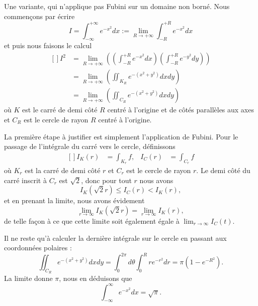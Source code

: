 \begin{example}
    Une variante, qui n'applique pas Fubini sur un domaine non borné. Nous commençons par écrire
\begin{equation}
	I=\int_{-\infty}^{+\infty} e^{-x^2} dx := \lim_{R \to +\infty} \int_{-R}^{+R} e^{-x^2} dx 
\end{equation}
et puis nous faisons le calcul
\begin{equation}		\label{EqCalculInteeemoisxcar}
	\begin{aligned}[]
		I^2 &= \lim_{R \to +\infty} \left( (\int_{-R}^{+R} e^{-x^2} dx)( \int_{-R}^{+R} e^{-y^2} dy) \right) \\
		&= \lim_{R \to +\infty} \left( \iint_{K_R}e^{-(x^2+y^2)} dx dy \right) \\
		&= \lim_{R \to +\infty} \left( \iint_{C_R}e^{-(x^2+y^2)} dx dy \right) 
	\end{aligned}
\end{equation}
où $K$ est le carré de demi côté $R$ centré à l'origine et de côtés parallèles aux axes et $C_R$ est le cercle de rayon $R$ centré à l'origine.

	La première étape à justifier est simplement l'application de Fubini. Pour le passage de l'intégrale du carré vers le cercle, définissons
	\begin{equation}
		\begin{aligned}[]
			I_K(r)&=\int_{K_r}f,&I_C(r)&=\int_{C_r}f
		\end{aligned}
	\end{equation}
	où $K_r$ est la carré de demi côté $r$ et $C_r$ est le cercle de rayon $r$. Le demi côté du carré inscrit à $C_r$ est $\sqrt{2}$, donc pour tout $r$ nous avons
	\begin{equation}
		I_K(\sqrt{2}r)\leq I_C(r)<I_K(r),
	\end{equation}
	et en prenant la limite, nous avons évidement
	\begin{equation}
		\lim_{r\to \infty}I_K(\sqrt{2}r)=\lim_{r\to\infty}I_K(r),
	\end{equation}
	de telle façon à ce que cette limite soit également égale à $\lim_{r\to\infty}I_C(t)$.


    Il ne reste qu'à calculer la dernière intégrale sur le cercle en passant aux coordonnées polaires :
	\begin{equation}
        \iint_{C_R} e^{-(x^2+y^2)}dxdy=\int_0^{2\pi}d\theta\int_0^Rr e^{-r^2}dr=\pi(1- e^{-R^2}).
	\end{equation}
	La limite donne $\pi$, nous en déduisons que
    \begin{equation}    \label{EqFDvHTg}
		\int_{-\infty}^{\infty} e^{-x^2}dx=\sqrt{\pi}.
	\end{equation}

\end{example}

